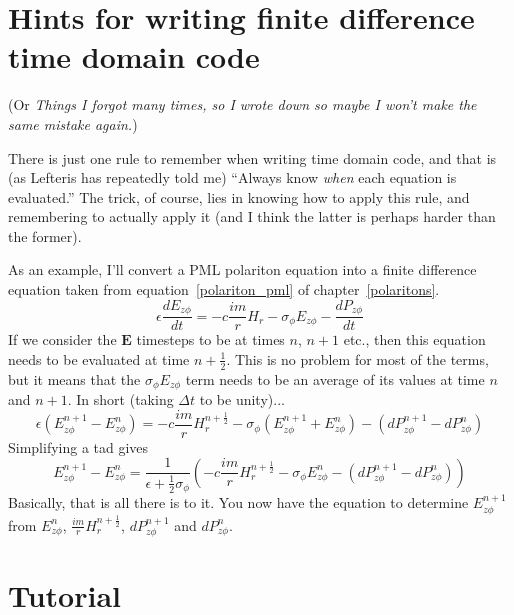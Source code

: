 \documentclass[floats]{book}
\begin{document}
\chapter{Hints for writing finite difference time domain code}

(Or \emph{Things I forgot many times, so I wrote down so maybe I won't make
  the same mistake again.})

There is just one rule to remember when writing time domain code, and that
is (as Lefteris has repeatedly told me) ``Always know \emph{when} each
equation is evaluated.''  The trick, of course, lies in knowing how to
apply this rule, and remembering to actually apply it (and I think the
latter is perhaps harder than the former).

As an example, I'll convert a PML polariton equation into a finite
difference equation taken from equation~\ref{polariton_pml} of
chapter~\ref{polaritons}.
\begin{equation*}
\epsilon\frac{dE_{z\phi}}{dt} = -c \frac{im}r H_r
             - \sigma_\phi E_{z\phi} - \frac{dP_{z\phi}}{dt}
\end{equation*}
If we consider the $\mathbf{E}$ timesteps to be at times $n$, $n+1$ etc.,
then this equation needs to be evaluated at time $n+\frac12$.  This is no
problem for most of the terms, but it means that the $\sigma_\phi
E_{z\phi}$ term needs to be an average of its values at time $n$ and
$n+1$.  In short (taking $\Delta t$ to be unity)...
\begin{equation*}
\epsilon (E_{z\phi}^{n+1} - E_{z\phi}^n) = -c \frac{im}r H_r^{n+\frac12}
  - \sigma_\phi ( E_{z\phi}^{n+1} + E_{z\phi}^n) - (dP_{z\phi}^{n+1} - dP_{z\phi}^n)
\end{equation*}
Simplifying a tad gives
\begin{equation*}
E_{z\phi}^{n+1} - E_{z\phi}^n = \frac1{\epsilon + \frac12\sigma_\phi}
    \left(-c \frac{im}r H_r^{n+\frac12}
  - \sigma_\phi E_{z\phi}^n - (dP_{z\phi}^{n+1} - dP_{z\phi}^n)\right)
\end{equation*}
Basically, that is all there is to it.  You now have the equation to
determine $E_{z\phi}^{n+1}$ from $E_{z\phi}^n$, $\frac{im}r
H_r^{n+\frac12}$, $dP_{z\phi}^{n+1}$ and $dP_{z\phi}^n$.

\chapter{Tutorial}





















\appendix


\end{document}

